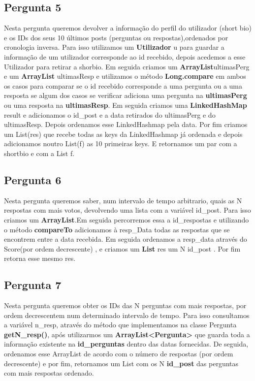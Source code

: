 \documentclass[a4paper]{article}
\begin{document}
	\subsection{Pergunta 5}
		Nesta pergunta queremos devolver a informação do
		perfil do utilizador (short bio) e os IDs dos seus 10 últimos posts (perguntas ou respostas),ordenados por cronologia inversa. Para isso utilizamos um \textbf{Utilizador} u para guardar a informação de um utilizador corresponde ao id recebido, depois acedemos a esse Utilizador para retirar a shorbio.
		Em seguida criamos um \textbf{ArrayList}ultimasPerg e um \textbf{ArrayList} ultimasResp e utilizamos o método \textbf{Long.compare} em ambos os casos para comparar se o id recebido corresponde a uma pergunta ou a uma resposta  se algum dos casos se verificar adiciona uma pergunta na \textbf{ultimasPerg} ou uma resposta na \textbf{ultimasResp}.
		Em seguida criamos uma \textbf{LinkedHashMap} result e adicionamos o id_post e a data retirados do ultimasPerg e do ultimasResp. Depois ordenamos esse LinkedHashmap pela data. Por fim criamos um List(res) que recebe todas as keys da LinkedHashmap já ordenada e depois adicionamos noutro List(f) as 10 primeiras keys. E retornamos um par com a shortbio e com a List f.

	\subsection{Pergunta 6}
		Nesta pergunta queremos saber, num intervalo de tempo arbitrario, quais as N respostas com mais votos, devolvendo uma lista com  a variável id_post. Para isso criamos um \textbf{ArrayList}.Em seguida percorremos essa a id_respostas e utilizando o método \textbf{compareTo} adicionamos à resp_Data todas as respostas que se encontrem entre a data recebida. Em seguida ordenamos a resp_data através do Score(por ordem decrescente) , e criamos um \textbf{List} res um N id_post . Por fim retorna esse mesmo res.
	\subsection{Pergunta 7}
		Nesta pergunta queremos obter os IDs das N perguntas com mais respostas, por ordem decrescentem num determinado intervalo de tempo. Para isso consultamos a variável n_resp, através do método que implementamos na classe Pergunta \textbf{getN_resp()}, após utilizarmos um \textbf{ArrayList<Pergunta>} que guarda toda a informação existente na \textbf{id_perguntas} dentro das datas fornecidas. De seguida, ordenamos esse ArrayList de acordo com o número de respostas (por ordem decrescente) e por fim, retornamos um List com os N \textbf{id_post} das perguntas com mais respostas ordenado.
\end{document}
